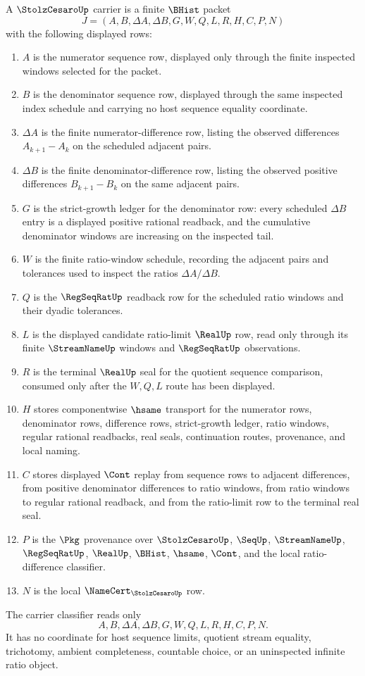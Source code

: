 \begin{definition}
\label{def:stolz-cesaro-carrier}
A $\StolzCesaroUp$ carrier is a finite $\BHist$ packet
$$
J=(A,B,\Delta A,\Delta B,G,W,Q,L,R,H,C,P,N)
$$
with the following displayed rows:
\begin{enumerate}
\item $A$ is the numerator sequence row, displayed only through the finite inspected windows selected for the packet.
\item $B$ is the denominator sequence row, displayed through the same inspected index schedule and carrying no host sequence equality coordinate.
\item $\Delta A$ is the finite numerator-difference row, listing the observed differences $A_{k+1}-A_k$ on the scheduled adjacent pairs.
\item $\Delta B$ is the finite denominator-difference row, listing the observed positive differences $B_{k+1}-B_k$ on the same adjacent pairs.
\item $G$ is the strict-growth ledger for the denominator row: every scheduled $\Delta B$ entry is a displayed positive rational readback, and the cumulative denominator windows are increasing on the inspected tail.
\item $W$ is the finite ratio-window schedule, recording the adjacent pairs and tolerances used to inspect the ratios $\Delta A/\Delta B$.
\item $Q$ is the $\RegSeqRatUp$ readback row for the scheduled ratio windows and their dyadic tolerances.
\item $L$ is the displayed candidate ratio-limit $\RealUp$ row, read only through its finite $\StreamNameUp$ windows and $\RegSeqRatUp$ observations.
\item $R$ is the terminal $\RealUp$ seal for the quotient sequence comparison, consumed only after the $W,Q,L$ route has been displayed.
\item $H$ stores componentwise $\hsame$ transport for the numerator rows, denominator rows, difference rows, strict-growth ledger, ratio windows, regular rational readbacks, real seals, continuation routes, provenance, and local naming.
\item $C$ stores displayed $\Cont$ replay from sequence rows to adjacent differences, from positive denominator differences to ratio windows, from ratio windows to regular rational readback, and from the ratio-limit row to the terminal real seal.
\item $P$ is the $\Pkg$ provenance over $\StolzCesaroUp$, $\SeqUp$, $\StreamNameUp$, $\RegSeqRatUp$, $\RealUp$, $\BHist$, $\hsame$, $\Cont$, and the local ratio-difference classifier.
\item $N$ is the local $\NameCert_{\StolzCesaroUp}$ row.
\end{enumerate}
The carrier classifier reads only
$$
A,B,\Delta A,\Delta B,G,W,Q,L,R,H,C,P,N.
$$
It has no coordinate for host sequence limits, quotient stream equality, trichotomy, ambient completeness, countable choice, or an uninspected infinite ratio object.
\end{definition}

